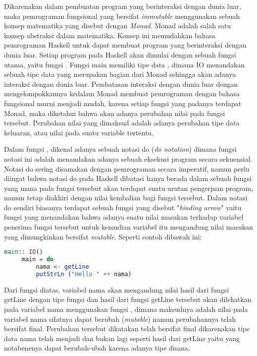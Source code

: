 \documentclass[pi.tex]{subfile}
\begin{document}
  Dikarenakan dalam pembuatan program yang berinteraksi dengan dunia luar, maka pemrograman fungsional yang bersifat \emph{immutable} menggunakan sebuah konsep matematika yang disebut dengan \emph{Monad}. Monad adalah salah satu konsep abstraksi dalam matematika. Konsep ini memudahkan bahasa pemrograman Haskell untuk dapat membuat program yang berinteraksi dengan dunia luar. Setiap program pada Haskell akan dimulai dengan sebuah fungsi utama, yaitu fungsi . Fungsi main memiliki tipe data , dimana IO menandakan sebuah tipe data yang merupakan bagian dari Monad sehingga akan adanya interaksi dengan dunia luar. Pembatasan interaksi dengan dunia luar dengan mengelompokkannya kedalam Monad membuat pemrograman dengan bahasa fungsional murni menjadi mudah, karena setiap fungsi yang padanya terdapat Monad, maka diketahui bahwa akan adanya perubahan nilai pada fungsi tersebut. Perubahan nilai yang dimaksud adalah adanya perubahan tipe data keluaran, atau nilai pada suatu variable tertentu.

  Dalam fungsi , dikenal adanya sebuah notasi do (\emph{do notation}) dimana fungsi notasi ini adalah menandakan adanya sebuah eksekusi program secara sekuensial. Notasi do sering disamakan dengan pemrograman secara imperatif, namun perlu diingat bahwa notasi do pada Haskell dibatasi hanya berada dalam sebuah fungsi yang mana pada fungsi tersebut akan terdapat suatu urutan pengerjaan program, namun tetap diakhiri dengan nilai kembalian bagi fungsi tersebut. Dalam notasi do sendiri biasanya terdapat sebuah fungsi \fhaskell{($<$-)} yang disebut "\emph{binding arrow}" yaitu fungsi yang menandakan bahwa adanya suatu nilai masukan terhadap variabel penerima fungsi tersebut untuk kemudian variabel itu mengandung nilai masukan yang dimungkinkan bersifat \emph{mutable}. Seperti contoh dibawah ini:\\
   \begin{lstlisting}[language=Haskell]
     main:: IO()
     main = do
         nama <- getLine
         putStrLn ("Hello " ++ nama)
   \end{lstlisting}

   Dari fungsi diatas, variabel nama akan mengandung nilai hasil dari fungsi getLine dengan tipe fungsi  dan hasil dari fungsi getLine tersebut akan dilekatkan pada variabel nama menggunakan fungsi \fhaskell{($<$-)}, dimana maksudnya adalah nilai pada variabel nama sifatnya dapat berubah (\emph{mutable}) namun perubahannya telah bersifat final. Perubahan tersebut dikatakan telah bersifat final dikarenakan tipe data nama telah menjadi  dan bukan lagi seperti hasil dari getLine yaitu  yang notabenenya dapat berubah-ubah karena adanya tipe  disana.
\end{document}
